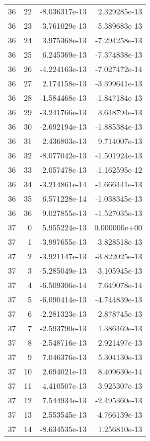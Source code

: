 \begin{tabular}{rrrr}
  36 &   22 & -8.036317e-13 &  2.329285e-13 \\
  36 &   23 & -3.761029e-13 & -5.389683e-13 \\
  36 &   24 &  3.975368e-13 & -7.294258e-13 \\
  36 &   25 &  6.245369e-13 & -7.374838e-13 \\
  36 &   26 & -4.224163e-13 & -7.027472e-14 \\
  36 &   27 &  2.174158e-13 & -3.399641e-13 \\
  36 &   28 & -1.584468e-13 & -1.847184e-13 \\
  36 &   29 & -3.241766e-13 &  3.648794e-13 \\
  36 &   30 & -2.692194e-13 & -1.885384e-13 \\
  36 &   31 &  2.436803e-13 &  9.714007e-13 \\
  36 &   32 & -8.077042e-13 & -1.501924e-13 \\
  36 &   33 &  2.057478e-13 & -1.162595e-12 \\
  36 &   34 & -3.214861e-14 & -1.666441e-13 \\
  36 &   35 &  6.571228e-14 & -1.038345e-13 \\
  36 &   36 &  9.027855e-13 & -1.527035e-13 \\
  37 &    0 &  5.955224e-13 &  0.000000e+00 \\
  37 &    1 & -3.997655e-13 & -3.828518e-13 \\
  37 &    2 & -3.921147e-13 & -3.822025e-13 \\
  37 &    3 & -5.285049e-13 & -3.105945e-13 \\
  37 &    4 & -6.509306e-14 &  7.649078e-14 \\
  37 &    5 & -6.090414e-13 & -4.744839e-13 \\
  37 &    6 & -2.281323e-13 &  2.878745e-13 \\
  37 &    7 & -2.593790e-13 &  1.386469e-13 \\
  37 &    8 & -2.548716e-13 &  2.921497e-13 \\
  37 &    9 &  7.046376e-13 &  5.304130e-13 \\
  37 &   10 &  2.694021e-13 &  8.409630e-14 \\
  37 &   11 &  4.410507e-13 &  3.925307e-13 \\
  37 &   12 &  7.544934e-13 & -2.495360e-13 \\
  37 &   13 &  2.553545e-13 & -4.766139e-13 \\
  37 &   14 & -8.634535e-13 &  1.256810e-13 \\

\end{tabular}
